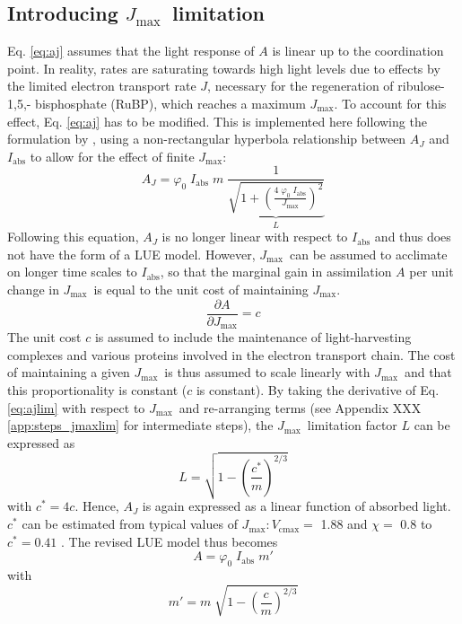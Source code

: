 \documentclass{myreport}
\newcommand{\vcmax}{$V_{\text{cmax}}$}
\newcommand{\jmax}{$J_{\text{max}}$}
\begin{document}
\subsection{Introducing \jmax\ limitation}
\label{sec:jmax}
Eq. \ref{eq:aj} assumes that the light response of $A$ is linear up to the coordination point. In reality, rates are saturating towards high light levels due to effects by the limited electron transport rate $J$, necessary for the regeneration of ribulose-1,5,- bisphosphate (RuBP), which reaches a maximum \jmax . To account for this effect, Eq. \ref{eq:aj} has to be modified. This is implemented here following the formulation by \cite{smith37}, using a non-rectangular hyperbola relationship between $A_J$ and $I_{\mathrm{abs}}$ to allow for the effect of finite $J_{\mathrm{max}}$:
\begin{equation}
\label{eq:ajlim}
    A_J = \varphi_0 \; I_{\mathrm{abs}} \; m \; \underbrace{ \frac{1}{\sqrt{1+ \left( \frac{4\;\varphi_0\;I_{\mathrm{abs}}}{J_{\mathrm{max}}} \right)^{2}}} }_{L}
\end{equation}
Following this equation, $A_J$ is no longer linear with respect to $I_{\mathrm{abs}}$ and thus does not have the form of a LUE model. However, \jmax\ can be assumed to acclimate on longer time scales to $I_{\mathrm{abs}}$, so that the marginal gain in assimilation $A$ per unit change in \jmax\ is equal to the unit cost of maintaining \jmax .
\begin{equation}
\label{eq:jmaxpartial}
    \frac{\partial A}{\partial J_{\mathrm{max}}} = c 
\end{equation}
The unit cost $c$ is assumed to include the maintenance of light-harvesting complexes and various proteins involved in the electron transport chain. The cost of maintaining a given \jmax\ is thus assumed to scale linearly with \jmax\ and that this proportionality is constant ($c$ is constant). By taking the derivative of Eq. \ref{eq:ajlim} with respect to \jmax\ and re-arranging terms (see Appendix XXX \ref{app:steps_jmaxlim} for intermediate steps), the \jmax\ limitation factor $L$ can be expressed as
\begin{equation}
    L = \sqrt{ 1 - \left( \frac{c^\ast}{m} \right)^{2/3} }
\end{equation}
with $c^\ast = 4c$. Hence, $A_J$ is again expressed as a linear function of absorbed light. $c^\ast$ can be estimated from typical values of \jmax $:$\vcmax $=$ 1.88 \citep{kattge07} and $\chi =$ 0.8 \citep{lloyd94} to $c^\ast = 0.41$ \citep{wang17natpl}. The revised LUE model thus becomes
\begin{equation}
\label{eq:ajlim4}
    A = \varphi_0 \; I_{\mathrm{abs}} \; m'
\end{equation}
with
\begin{equation}
    m' = m \; \sqrt{1 - \left( \frac{c}{m} \right)^{2/3} }
\end{equation}
\end{document}
